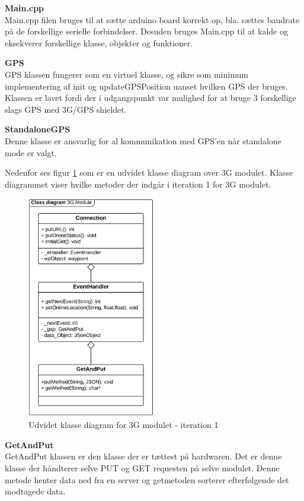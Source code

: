 \textbf{Main.cpp} \\
Main.cpp filen bruges til at sætte arduino board korrekt op, bla. sættes baudrate på de forskellige serielle forbindelser. Desuden bruges Main.cpp til at kalde og eksekverer forskellige klasse, objekter og funktioner.

\textbf{GPS} \\
GPS klassen fungerer som en virtuel klasse, og sikre som minimum implementering af init og updateGPSPosition uanset hvilken GPS der bruges. Klassen er lavet fordi der i udgangspunkt var mulighed for at bruge 3 forskellige slags GPS med 3G/GPS shieldet. 

\textbf{StandaloneGPS}\\
Denne klasse er ansvarlig for al kommunikation med GPS'en når standalone mode er valgt. 

\newpage

Nedenfor ses figur \ref{fig:udvidet3G_it1} som er en udvidet klasse diagram over 3G modulet. Klasse diagrammet viser hvilke metoder der indgår i iteration 1 for 3G modulet. 

\begin{figure}[H]
	\centering
	\includegraphics[width=0.50\textwidth]{Billeder/klasse_diagrammer/udvidet3G_iteration1.png}
	\vspace{0.5cm}
	\caption{Udvidet klasse diagram for 3G modulet - iteration 1}
	\label{fig:udvidet3G_it1}
\end{figure}


\textbf{GetAndPut} \\
GetAndPut klassen er den klasse der er tættest på hardwaren. Det er denne klasse der håndterer selve PUT og GET requesten på selve modulet. 
Denne metode henter data ned fra en server og getmetoden sorterer efterfølgende det modtagede data. 

